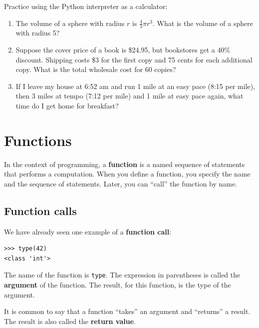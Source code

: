 \documentclass[10pt]{book}
\begin{document}
\begin{exercise}

Practice using the Python interpreter as a calculator:

\begin{enumerate}

\item The volume of a sphere with radius $r$ is $\frac{4}{3} \pi r^3$.
  What is the volume of a sphere with radius 5?

\item Suppose the cover price of a book is \$24.95, but bookstores get a
  40\% discount.  Shipping costs \$3 for the first copy and 75 cents
  for each additional copy.  What is the total wholesale cost for
  60 copies?

\item If I leave my house at 6:52 am and run 1 mile at an easy pace
  (8:15 per mile), then 3 miles at tempo (7:12 per mile) and 1 mile at
  easy pace again, what time do I get home for breakfast?

\end{enumerate}
\end{exercise}


\chapter{Functions}
\label{funcchap}

In the context of programming, a {\bf function} is a named sequence of
statements that performs a computation.  When you define a function,
you specify the name and the sequence of statements.  Later, you can
``call'' the function by name.

\section{Function calls}
\label{functionchap}

We have already seen one example of a {\bf function call}:

\begin{verbatim}
>>> type(42)
<class 'int'>
\end{verbatim}
%
The name of the function is {\tt type}.  The expression in parentheses
is called the {\bf argument} of the function.  The result, for this
function, is the type of the argument.

It is common to say that a function ``takes'' an argument and ``returns''
a result.  The result is also called the {\bf return value}.
\end{document}
